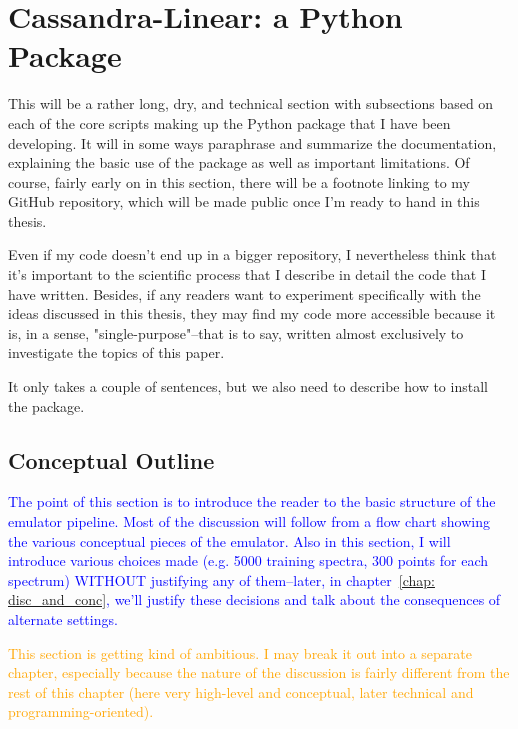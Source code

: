 \chapter{Cassandra-Linear: a Python Package}

This will be a rather long, dry, and technical section with subsections based on each of the core scripts making up the Python package that I have been developing. It will in some ways paraphrase and summarize the documentation, explaining the basic use of the package as well as important limitations. Of course, fairly early on in this section, there will be a footnote linking to my GitHub repository, which will be made public once I'm ready to hand in this thesis.

Even if my code doesn't end up in a bigger repository, I nevertheless think that it's important to the scientific process that I describe in detail the code that I have written. Besides, if any readers want to experiment specifically with the ideas discussed in this thesis, they may find my code more accessible because it is, in a sense, "single-purpose"--that is to say, written almost exclusively to investigate the topics of this paper.

It only takes a couple of sentences, but we also need to describe how to install the package.

\section{Conceptual Outline}
\label{sec: cassL_concept}

\textcolor{blue}{The point of this section is to introduce the reader to the
basic structure of the emulator pipeline. Most of the discussion will follow
from a flow chart showing the various conceptual pieces of the emulator. Also
in this section, I will introduce various choices made (e.g. 5000 training
spectra, 300 points for each spectrum) WITHOUT justifying any of them--later,
in chapter~\ref{chap: disc_and_conc}, we'll justify these decisions and
talk about the consequences of alternate settings.}

\textcolor{orange}{This section is getting kind of ambitious. I may break it
out into a separate chapter, especially because the nature of the discussion
is fairly different from the rest of this chapter (here very high-level
and conceptual, later technical and programming-oriented).}


